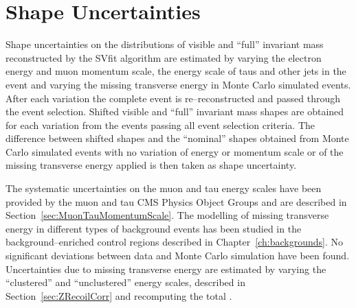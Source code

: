 \section{Shape Uncertainties}
\label{sec:ShapeUncertainties}
%
Shape uncertainties on the distributions of visible and ``full'' invariant mass
reconstructed by the SVfit algorithm are estimated by varying the electron
energy and muon momentum scale, the energy scale of taus and other jets in
the event and varying the missing transverse energy in Monte Carlo simulated
events.  After each variation the complete event is re--reconstructed and passed
through the event selection.  Shifted visible and ``full'' invariant mass shapes
are obtained for each variation from the events passing all event selection
criteria.  The difference between shifted shapes and the ``nominal'' shapes
obtained from Monte Carlo simulated events with no variation of energy or
momentum scale or of the missing transverse energy applied is then taken as
shape uncertainty.

The systematic uncertainties on the muon and tau energy scales have been
provided by the muon and tau CMS Physics Object Groups and are described in
Section~\ref{sec:MuonTauMomentumScale}.  The modelling of missing transverse
energy in different types of background events has been studied in the
background--enriched control regions described in Chapter~\ref{ch:backgrounds}.
No significant deviations between data and Monte Carlo simulation have been
found.  
Uncertainties due to missing transverse energy are estimated by varying
the ``clustered'' and ``unclustered'' energy scales, described in
Section~\ref{sec:ZRecoilCorr} and recomputing the total \MET.

